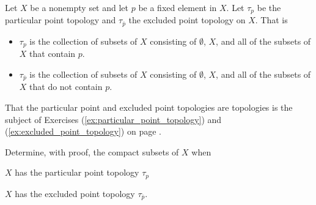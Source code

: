 \item Let $X$ be a nonempty set and let $p$ be a fixed element in $X$. Let $\tau_p$ be the particular point topology and $\tau_{\overline{p}}$ the excluded point topology on $X$. That is
\begin{itemize}
\item $\tau_{p}$ is the collection of subsets of $X$ consisting of $\emptyset$, $X$, and all of the subsets of $X$ that contain $p$.  
\item $\tau_{\overline{p}}$ is the collection of subsets of $X$ consisting of $\emptyset$, $X$, and all of the subsets of $X$ that do not contain $p$.
\end{itemize}
That the particular point and excluded point topologies are topologies is the subject of Exercises (\ref{ex:particular_point_topology}) and (\ref{ex:excluded_point_topology}) on page \pageref{ex:particular_point_topology}. 

Determine, with proof, the compact subsets of $X$ when 
\ba
\item $X$ has the particular point topology $\tau_p$

\item $X$ has the excluded point topology $\tau_{\overline{p}}$. 

\ea

